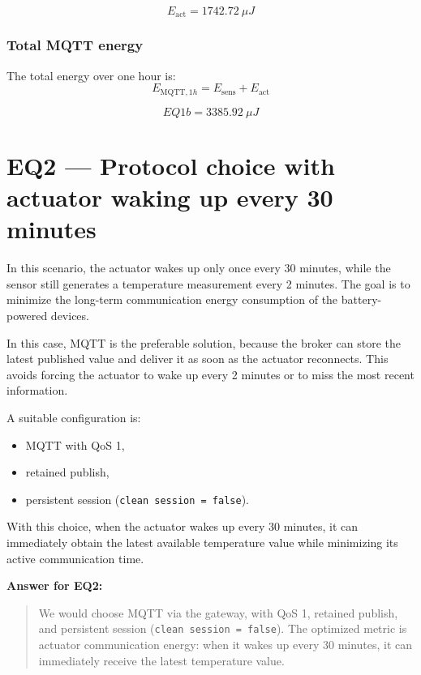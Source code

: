 \documentclass[a4paper,12pt]{article}
\begin{document}
\[
E_{\text{act}} = 1742.72 \ \mu J
\]

\subsubsection*{Total MQTT energy}

The total energy over one hour is:
\[
E_{\text{MQTT},1h} = E_{\text{sens}} + E_{\text{act}}
\]

\[
\boxed{EQ1b = 3385.92 \ \mu J}
\]

\section{EQ2 --- Protocol choice with actuator waking up every 30 minutes}

In this scenario, the actuator wakes up only once every 30 minutes, while the sensor still generates a temperature measurement every 2 minutes.
The goal is to minimize the long-term communication energy consumption of the battery-powered devices.

In this case, MQTT is the preferable solution, because the broker can store the latest published value and deliver it as soon as the actuator reconnects.
This avoids forcing the actuator to wake up every 2 minutes or to miss the most recent information.

A suitable configuration is:
\begin{itemize}[leftmargin=1.5cm]
    \item MQTT with QoS 1,
    \item retained publish,
    \item persistent session (\texttt{clean session = false}).
\end{itemize}

With this choice, when the actuator wakes up every 30 minutes, it can immediately obtain the latest available temperature value while minimizing its active communication time.

\bigskip
\noindent
\textbf{Answer for EQ2:}

\begin{quote}
We would choose MQTT via the gateway, with QoS 1, retained publish, and persistent session (\texttt{clean session = false}). The optimized metric is actuator communication energy: when it wakes up every 30 minutes, it can immediately receive the latest temperature value.
\end{quote}
\end{document}
